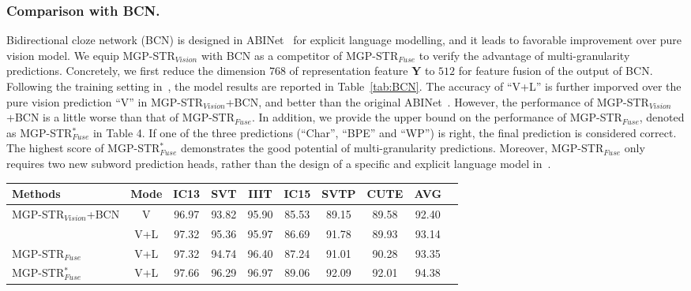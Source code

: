 \documentclass[runningheads]{llncs}
\newcommand{\ra}[1]{\renewcommand{\arraystretch}{#1}}
\begin{document}
\subsubsection{Comparison with BCN.}
Bidirectional cloze network (BCN) is designed in ABINet~\cite{ABInet} for explicit language modelling, and it leads to favorable improvement over pure vision model. We equip MGP-STR$_{Vision}$ with BCN as a competitor of MGP-STR$_{Fuse}$ to verify the advantage of multi-granularity predictions. Concretely, we first reduce the dimension $768$ of representation feature $\mathbf{Y}$ to $512$ for feature fusion of the output of BCN. Following the training setting in~\cite{ABInet}, the model results are reported in Table~\ref{tab:BCN}.  The accuracy of ``V+L'' is  further imporved over the pure vision prediction ``V'' in MGP-STR$_{Vision}$+BCN, and better than the original ABINet~\cite{ABInet}. However, the performance of MGP-STR$_{Vision}$+BCN is a little worse than that of MGP-STR$_{Fuse}$. In addition, we provide the upper bound on the performance of MGP-STR$_{Fuse}$, denoted as MGP-STR$_{Fuse}^*$ in Table 4. If one of the three predictions (``Char'', ``BPE'' and ``WP'') is right, the final prediction is considered correct. 
The highest score of MGP-STR$_{Fuse}^*$ demonstrates the good potential of  multi-granularity predictions.
Moreover, MGP-STR$_{Fuse}$ only requires two new subword prediction heads, rather than the design of a specific and explicit language model in~\cite{ABInet,SRN}. 


\begin{table*}[t]\centering
\setlength{\tabcolsep}{4pt}
\ra{1}
\caption{The accuracy results of MGP-STR$_{Vision}$ equipped with BCN and multi-granularity prediction. ``V'' represents the results of the pure vision output. ``V+L'' represents the results based on the both vision and language parts.}
\label{tab:BCN}
\begin{tabular}{|l|c|c|c|c|c|c|c|c|c|}
\hline
Methods & Mode &IC13&SVT  &IIIT   & IC15 & SVTP &CUTE  &AVG \\
\hline
\multirow{2}{*}{MGP-STR$_{Vision}$+BCN}  &  V &96.97	&93.82	&95.90	&85.53	&89.15	&89.58	&92.40	 \\
& V+L &97.32	&95.36	&95.97	&86.69	&91.78	&89.93	&93.14	 \\
\hline
MGP-STR$_{Fuse}$   & V+L &97.32	&94.74	&96.40	&87.24	&91.01	&90.28	&93.35	 \\
MGP-STR$_{Fuse}^*$   & V+L &97.66	&96.29	&96.97	&89.06	&92.09	&92.01	&94.38	 \\
\hline
\end{tabular}
\end{table*}
\end{document}
